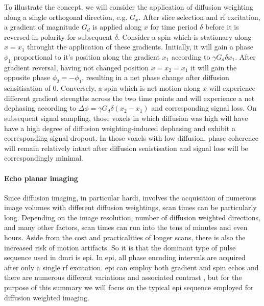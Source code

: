 To illustrate the concept, we will consider the application of diffusion weighting along a single orthogonal direction, e.g. $G_x$.
After slice selection and \gls{rf} excitation, a gradient of magnitude $G_d$ is applied along $x$ for time period $\delta$ before it is reversed in polarity for subsequent $\delta$.
Consider a spin which is stationary along $x=x_1$ throught the application of these gradients.
Initially, it will gain a phase $\phi_1$ proportional to it's position along the gradient $x_1$ according to $\gamma G_d \delta x_1$.
After gradient reversal, having not changed position $x=x_2=x_1$ it will gain the opposite phase $\phi_2 = -\phi_1$, resulting in a net phase change after diffusion sensitisation of $0$.
Conversely, a spin which is net motion along $x$ will experience different gradient strengths across the two time points and will experience a net dephasing according to $\Delta\phi = \gamma G_d \delta (x_2 - x_1)$  and corresponding signal loss.
On subsequent signal sampling, those voxels in which diffusion was high will have have a high degree of diffusion weighting-induced dephasing and exhibit a corresponding signal dropout.
In those voxels with low diffusion, phase coherence will remain relatively intact after diffusion senistisation and signal loss will be correspondingly minimal.

\paragraph{Echo planar imaging}

Since diffusion imaging, in particular \gls{hardi}, involves the acquisition of numerous image volumes with different diffusion weightings, scan times can be particularly long.
Depending on the image resolution, number of diffusion weighted directions, and many other factors, scan times can run into the tens of minutes and even hours.
Aside from the cost and practicalities of longer scans, there is also the increased risk of motion artifacts.
So it is that the dominant  type of pulse sequence used in \gls{dmri} is \gls{epi}.
In \gls{epi}, all phase encoding intervals are acquired after only a single \gls{rf} excitation.
\Gls{epi} can employ both gradient and spin echos and there are numerous different variations and associated contrast , but for the purpose of this summary we will focus on the typical \gls{epi} sequence employed for diffusion weighted imaging.
